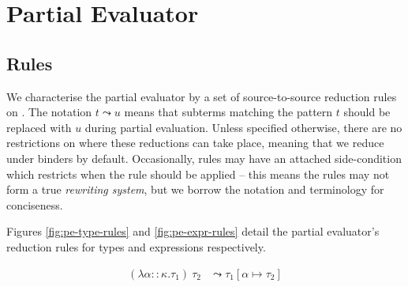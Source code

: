 \documentclass[runningheads]{llncs}
\begin{document}
\section{Partial Evaluator}

\subsection{Rules}

We characterise the partial evaluator by a set of source-to-source reduction rules on \core{}. The notation $t \leadsto u$ means that subterms matching the pattern $t$ should be replaced with $u$ during partial evaluation. Unless specified otherwise, there are no restrictions on where these reductions can take place, meaning that we reduce under binders by default. Occasionally, rules may have an attached side-condition which restricts when the rule should be applied -- this means the rules may not form a true \emph{rewriting system}\cite{jay1991long}, but we borrow the notation and terminology for conciseness.

Figures \ref{fig:pe-type-rules} and \ref{fig:pe-expr-rules} detail the partial evaluator's reduction rules for types and expressions respectively.


\begin{figure*}[h]

  \begin{minipage}[c]{\textwidth}
    \begin{align}
      (\lambda \alpha :: \kappa . \tau_1)\ \tau_2 &\leadsto \tau_1[\alpha \mapsto \tau_2]
    \end{align}
  \end{minipage}

  \caption{Reduction rules for partially evaluating types.}
  \label{fig:pe-type-rules}
\end{figure*}

\end{document}
